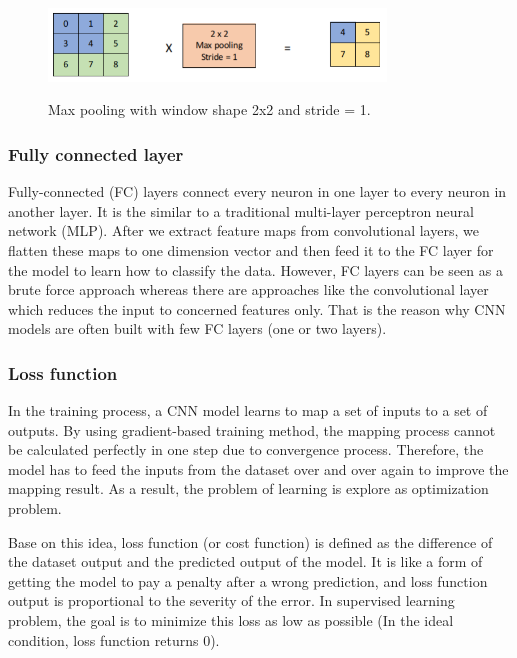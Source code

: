 	\begin{figure}[H]
		\centering
		{\includegraphics[width=0.8\textwidth]{./hinhanh/chap3/max_pooling.png}}
		\caption{Max pooling with window shape 2x2 and stride = 1.}
		\label{fig:max_pooling}
	\end{figure}
	
\subsubsection{Fully connected layer}
\label{subsubsection:fclayer}
\noindent

	Fully-connected (FC) layers connect every neuron in one layer to every neuron in another layer. It is the similar to a traditional multi-layer perceptron neural network (MLP). After we extract feature maps from convolutional layers, we flatten these maps to one dimension vector and then feed it to the FC layer for the model to learn how to classify the data. However, FC layers can be seen as a brute force approach whereas there are approaches like the convolutional layer which reduces the input to concerned features only. That is the reason why CNN models are often built with few FC layers (one or two layers).	
	
\subsubsection{Loss function}
\label{subsubsection:lossfunc}
\noindent

	In the training process, a CNN model learns to map a set of inputs to a set of outputs. By using gradient-based training method, the mapping process cannot be calculated perfectly in one step due to convergence process. Therefore, the model has to feed the inputs from the dataset over and over again to improve the mapping result. As a result, the problem of learning is explore as optimization problem. 
	
	Base on this idea, loss function (or cost function) is defined as the difference of the dataset output and the predicted output of the model. It is like a form of getting the model to pay a penalty after a wrong prediction, and loss function output is proportional to the severity of the error. In supervised learning problem, the goal is to minimize this loss as low as possible (In the ideal condition, loss function returns 0).
	
